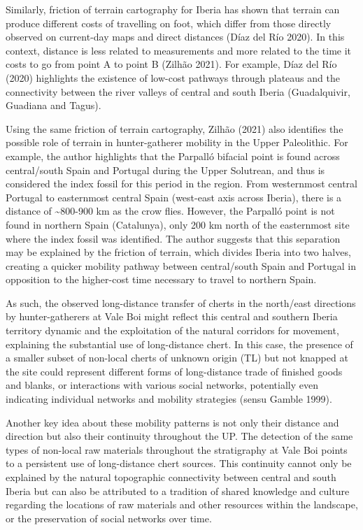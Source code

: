 \documentclass[
  a4paper,
  DIV=11,
  numbers=noendperiod]{scrreprt}
\begin{document}
Similarly, friction of terrain cartography for Iberia has shown that
terrain can produce different costs of travelling on foot, which differ
from those directly observed on current-day maps and direct distances
(Díaz del Río 2020). In this context, distance is less related to
measurements and more related to the time it costs to go from point A to
point B (Zilhão 2021). For example, Díaz del Río (2020) highlights the
existence of low-cost pathways through plateaus and the connectivity
between the river valleys of central and south Iberia (Guadalquivir,
Guadiana and Tagus).

Using the same friction of terrain cartography, Zilhão (2021) also
identifies the possible role of terrain in hunter-gatherer mobility in
the Upper Paleolithic. For example, the author highlights that the
Parpalló bifacial point is found across central/south Spain and Portugal
during the Upper Solutrean, and thus is considered the index fossil for
this period in the region. From westernmost central Portugal to
easternmost central Spain (west-east axis across Iberia), there is a
distance of \textasciitilde800-900 km as the crow flies. However, the
Parpalló point is not found in northern Spain (Catalunya), only 200 km
north of the easternmost site where the index fossil was identified. The
author suggests that this separation may be explained by the friction of
terrain, which divides Iberia into two halves, creating a quicker
mobility pathway between central/south Spain and Portugal in opposition
to the higher-cost time necessary to travel to northern Spain.

As such, the observed long-distance transfer of cherts in the north/east
directions by hunter-gatherers at Vale Boi might reflect this central
and southern Iberia territory dynamic and the exploitation of the
natural corridors for movement, explaining the substantial use of
long-distance chert. In this case, the presence of a smaller subset of
non-local cherts of unknown origin (TL) but not knapped at the site
could represent different forms of long-distance trade of finished goods
and blanks, or interactions with various social networks, potentially
even indicating individual networks and mobility strategies (sensu
Gamble 1999).

Another key idea about these mobility patterns is not only their
distance and direction but also their continuity throughout the UP. The
detection of the same types of non-local raw materials throughout the
stratigraphy at Vale Boi points to a persistent use of long-distance
chert sources. This continuity cannot only be explained by the natural
topographic connectivity between central and south Iberia but can also
be attributed to a tradition of shared knowledge and culture regarding
the locations of raw materials and other resources within the landscape,
or the preservation of social networks over time.
\end{document}
